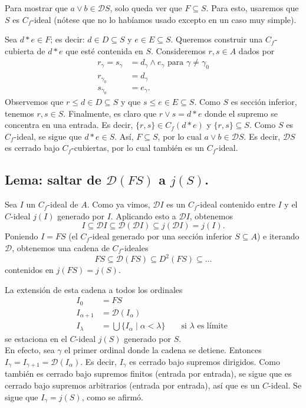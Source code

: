 \documentclass[12pt,letterpaper,titlepage]{article}
\theoremstyle{definition}
\renewcommand\sup{\vee}
\renewcommand\inf{\wedge}
\newcommand\D{\mathcal D}
\renewcommand\cal[1]{\mathcal{#1}}
\newcommand\tps[1]{\texorpdfstring{#1}{}}
\newcommand\<{\langle}
\renewcommand\>{\rangle}
\begin{document}
Para mostrar que $a\sup b\in\D S$,
solo queda ver que $F\subseteq S$.
Para esto, usaremos que $S$ es $C_f$-ideal (nótese que no lo
habíamos usado excepto en un caso muy simple).

Sea $d*e\in F$; es decir: $d\in D\subseteq S$ y $e\in E\subseteq S$.
Queremos construir una $C_f$-cubierta de $d*e$ que esté contenida
en $S$.
Consideremos  $r,s\in A$ dados por
\begin{align*}
  r_\gamma = s_\gamma
    &= d_\gamma \inf e_\gamma \text{ para } \gamma\neq\gamma_0 \\
  r_{\gamma_0} &= d_\gamma \\
  s_{\gamma_0} &= e_\gamma.
\end{align*}
Observemos que $r\leq d\in D\subseteq S$ y que $s\leq e\in
E\subseteq S$.
Como $S$ es sección inferior, tenemos $r,s\in S$.
Finalmente, es claro que $r\sup s = d*e$ donde el supremo se
concentra en una entrada.
Es decir, $\{r,s\}\in C_f(d*e)$ y $\{r,s\}\subseteq S$.
Como $S$ es $C_f$-ideal, se sigue que $d*e\in S$.
Así, $F\subseteq S$, por lo cual $a\sup b\in\D S$.
Es decir, $\D S$ es cerrado bajo $C_f$-cubiertas, por lo cual
también es un $C_f$-ideal.

\subsection{Lema: saltar de \tps{$\D(FS)$} a \tps{$j(S)$}.}
    Sea $I$ un $C_f$-ideal de $A$.
    Como ya vimos, $\D I$ es un $C_f$-ideal contenido
    entre $I$ y el $C$-ideal $j(I)$ generado por $I$.
    Aplicando esto a $\D I$, obtenemos
    \[
        I\subseteq \D I
        \subseteq \D(\D I)
        \subseteq j(\D I)=j(I)
    .\]
    Poniendo $I=FS$ (el $C_f$-ideal generado por una sección
    inferior $S\subseteq A$) e iterando $\D$, obtenemos una
    cadena de $C_f$-ideales
    \[
        FS \subseteq \cal D(FS)
        \subseteq D^2(FS)
        \subseteq \dots
    \]
    contenidos en $j(FS)=j(S)$.


    La extensión de esta cadena a todos los ordinales
    \begin{align*}
        I_0 &= FS \\
        I_{\alpha+1} &= \D(I_\alpha) \\
        I_\lambda
        &= \bigcup\{I_\alpha \mid \alpha<\lambda\}
            && \text{ si $\lambda$ es límite }
    \end{align*}
    se estaciona en el $C$-ideal $j(S)$ generado por $S$. \\
    En efecto, sea $\gamma$ el primer ordinal donde la cadena
    se detiene.
    Entonces $I_\gamma=I_{\gamma+1}=\D(I_\alpha)$.
    Es decir, $I_\gamma$ es cerrado bajo supremos dirigidos.
    Como también es cerrado bajo supremos finitos
    (entrada por entrada), se sigue
    que es cerrado bajo supremos arbitrarios
    (entrada por entrada), así que es
    un $C$-ideal.
    Se sigue que $I_\gamma=j(S)$, como se afirmó.
\end{document}
